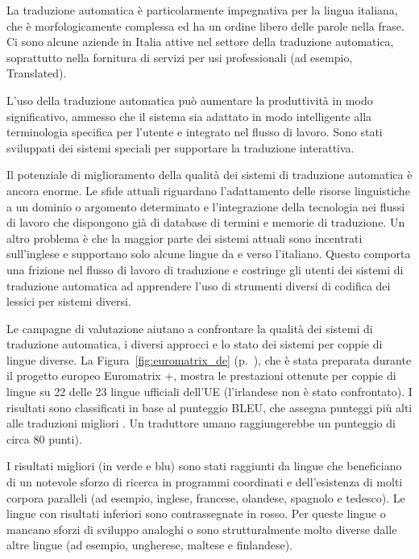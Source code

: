 \documentclass[]{../../metanetpaper}
\begin{document}
\begin{multicols}{2}

La traduzione automatica \`{e} particolarmente impegnativa per la lingua italiana, che \`{e} morfologicamente complessa ed ha un ordine libero delle parole nella frase. Ci sono alcune aziende in Italia attive nel settore della traduzione automatica, soprattutto nella fornitura di servizi per usi professionali (ad esempio, Translated).

L'uso della traduzione automatica pu\`{o} aumentare la produttivit\`{a} in modo significativo, ammesso che il sistema sia adattato in modo intelligente alla terminologia specifica per l'utente e integrato nel flusso di lavoro. Sono stati sviluppati dei sistemi speciali per supportare la traduzione interattiva.

Il potenziale di miglioramento della qualit\`{a} dei sistemi di traduzione automatica \`{e} ancora enorme. Le sfide attuali riguardano l'adattamento delle risorse linguistiche a un dominio o argomento determinato e l'integrazione della tecnologia nei flussi di lavoro che dispongono gi\`{a} di database di termini e memorie di traduzione. Un altro problema \`{e} che la maggior parte dei sistemi attuali sono incentrati sull'inglese e supportano solo alcune lingue da e verso l'italiano. Questo comporta una frizione nel flusso di lavoro di traduzione e costringe gli utenti dei sistemi di traduzione automatica ad apprendere l'uso di strumenti diversi di codifica dei lessici per sistemi diversi.

Le campagne di valutazione aiutano a confrontare la qualit\`{a} dei sistemi di
traduzione automatica, i diversi approcci e lo stato dei sistemi per coppie di
lingue diverse. La Figura~\ref{fig:euromatrix_de}
(p.~\pageref{fig:euromatrix_de}), che \`{e} stata preparata durante il progetto europeo Euromatrix +, mostra le prestazioni ottenute per coppie di
lingue su 22 delle 23 lingue ufficiali dell'UE (l'irlandese non \`{e} stato
confrontato). I risultati sono classificati in base al punteggio BLEU, che
assegna punteggi pi\`{u} alti alle traduzioni migliori \cite{bleu1}. Un traduttore umano
raggiungerebbe un punteggio di circa 80 punti).


I risultati migliori (in verde e blu) sono stati raggiunti da lingue che beneficiano di un notevole sforzo di ricerca in programmi coordinati e dell'esistenza di molti corpora paralleli (ad esempio, inglese, francese, olandese, spagnolo e tedesco). Le lingue con risultati inferiori sono contrassegnate in rosso. Per queste  lingue o mancano sforzi di sviluppo analoghi o sono strutturalmente molto diverse dalle altre lingue (ad esempio, ungherese, maltese e finlandese).



\end{multicols}
\end{document}
